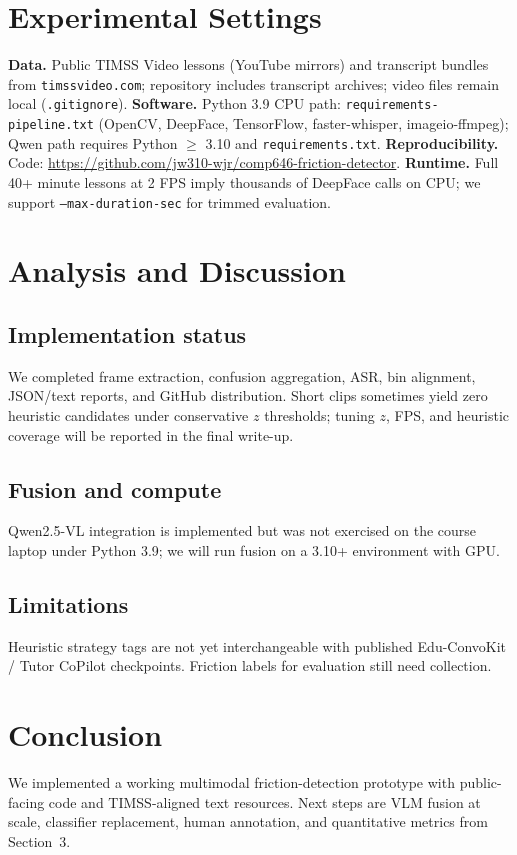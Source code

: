 \documentclass[11pt]{article}
\begin{document}
\section{Experimental Settings}
\textbf{Data.} Public TIMSS Video lessons (YouTube mirrors) and transcript bundles from \texttt{timssvideo.com}; repository includes transcript archives; video files remain local (\texttt{.gitignore}). \textbf{Software.} Python 3.9 CPU path: \texttt{requirements-pipeline.txt} (OpenCV, DeepFace, TensorFlow, faster-whisper, imageio-ffmpeg); Qwen path requires Python $\geq$ 3.10 and \texttt{requirements.txt}. \textbf{Reproducibility.} Code: \url{https://github.com/jw310-wjr/comp646-friction-detector}. \textbf{Runtime.} Full 40+ minute lessons at 2 FPS imply thousands of DeepFace calls on CPU; we support \texttt{--max-duration-sec} for trimmed evaluation.

\section{Analysis and Discussion}
\subsection{Implementation status}
We completed frame extraction, confusion aggregation, ASR, bin alignment, JSON/text reports, and GitHub distribution. Short clips sometimes yield zero heuristic candidates under conservative $z$ thresholds; tuning $z$, FPS, and heuristic coverage will be reported in the final write-up.

\subsection{Fusion and compute}
Qwen2.5-VL integration is implemented but was not exercised on the course laptop under Python 3.9; we will run fusion on a 3.10+ environment with GPU.

\subsection{Limitations}
Heuristic strategy tags are not yet interchangeable with published Edu-ConvoKit / Tutor CoPilot checkpoints. Friction labels for evaluation still need collection.

\section{Conclusion}
We implemented a working multimodal friction-detection prototype with public-facing code and TIMSS-aligned text resources. Next steps are VLM fusion at scale, classifier replacement, human annotation, and quantitative metrics from Section~3.
\end{document}
